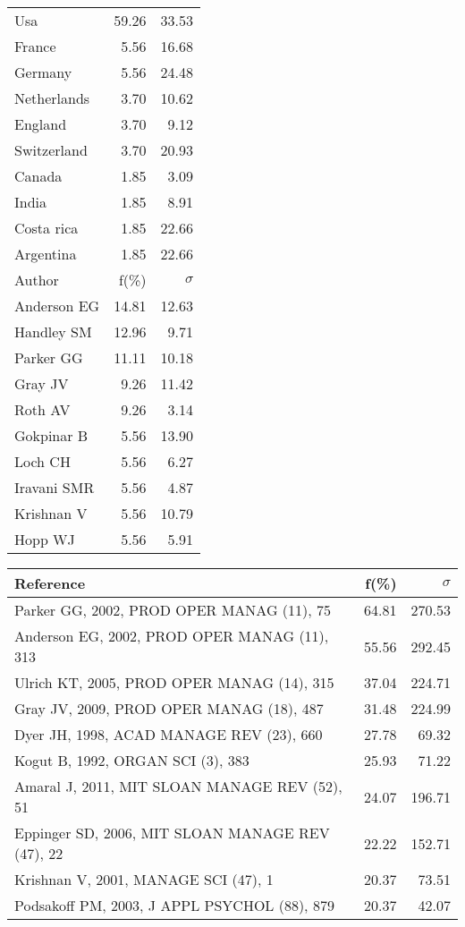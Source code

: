 \documentclass[a4paper,11pt]{report}
\begin{document}
\begin{landscape}
\begin{table}[!ht]
{\begin{tabular}{|l r r|}
\hline
Usa & 59.26 & 33.53\\
France & 5.56 & 16.68\\
Germany & 5.56 & 24.48\\
Netherlands & 3.70 & 10.62\\
England & 3.70 & 9.12\\
Switzerland & 3.70 & 20.93\\
Canada & 1.85 & 3.09\\
India & 1.85 & 8.91\\
Costa rica & 1.85 & 22.66\\
Argentina & 1.85 & 22.66\\
\hline
\hline
Author & f(\%) & $\sigma$\\
\hline
Anderson EG & 14.81 & 12.63\\
Handley SM & 12.96 & 9.71\\
Parker GG & 11.11 & 10.18\\
Gray JV & 9.26 & 11.42\\
Roth AV & 9.26 & 3.14\\
Gokpinar B & 5.56 & 13.90\\
Loch CH & 5.56 & 6.27\\
Iravani SMR & 5.56 & 4.87\\
Krishnan V & 5.56 & 10.79\\
Hopp WJ & 5.56 & 5.91\\
\hline
\end{tabular}
}
{\scriptsize\begin{tabular}{|l r r|}
\hline
Reference & f(\%) & $\sigma$\\
\hline
Parker GG, 2002, PROD OPER MANAG (11), 75 & 64.81 & 270.53\\
Anderson EG, 2002, PROD OPER MANAG (11), 313 & 55.56 & 292.45\\
Ulrich KT, 2005, PROD OPER MANAG (14), 315 & 37.04 & 224.71\\
Gray JV, 2009, PROD OPER MANAG (18), 487 & 31.48 & 224.99\\
Dyer JH, 1998, ACAD MANAGE REV (23), 660 & 27.78 & 69.32\\
Kogut B, 1992, ORGAN SCI (3), 383 & 25.93 & 71.22\\
Amaral J, 2011, MIT SLOAN MANAGE REV (52), 51 & 24.07 & 196.71\\
Eppinger SD, 2006, MIT SLOAN MANAGE REV (47), 22 & 22.22 & 152.71\\
Krishnan V, 2001, MANAGE SCI (47), 1 & 20.37 & 73.51\\
Podsakoff PM, 2003, J APPL PSYCHOL (88), 879 & 20.37 & 42.07\\

\end{tabular}}
\end{table}
\end{landscape}
\end{document}
